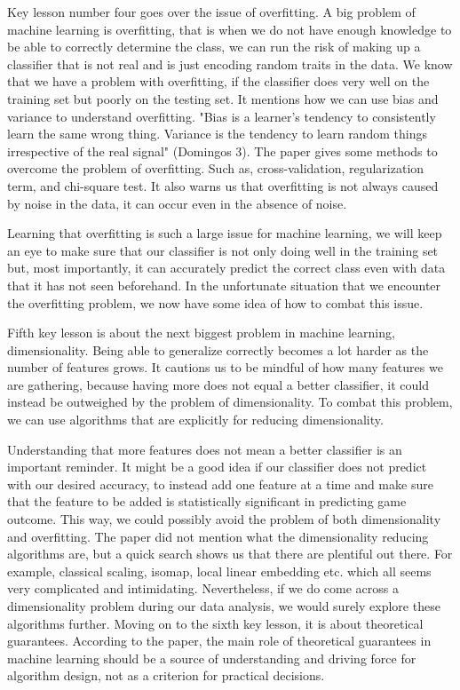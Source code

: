 \documentclass[a4paper,12pt]{report}
\begin{document}
Key lesson number four goes over the issue of overfitting. A big problem of machine learning is overfitting, that is when we do not have enough knowledge to be able to correctly determine the class, we can run the risk of making up a classifier that is not real and is just encoding random traits in the data. We know that we have a problem with overfitting, if the classifier does very well on the training set but poorly on the testing set. It mentions how we can use bias and variance to understand overfitting. "Bias is a learner’s tendency to consistently learn the same wrong thing. Variance is the tendency to learn random things irrespective of the real signal" (Domingos 3). The paper gives some methods to overcome the problem of overfitting. Such as, cross-validation, regularization term, and chi-square test. It also warns us that overfitting is not always caused by noise in the data, it can occur even in the absence of noise.

Learning that overfitting is such a large issue for machine learning, we will keep an eye to make sure that our classifier is not only doing well in the training set but, most importantly, it can accurately predict the correct class even with data that it has not seen beforehand. In the unfortunate situation that we encounter the overfitting problem, we now have some idea of how to combat this issue.

Fifth key lesson is about the next biggest problem in machine learning, dimensionality. Being able to generalize correctly becomes a lot harder as the number of features grows. It cautions us to be mindful of how many features we are gathering, because having more does not equal a better classifier, it could instead be outweighed by the problem of dimensionality. To combat this problem, we can use algorithms that are explicitly for reducing dimensionality.

Understanding that more features does not mean a better classifier is an important reminder. It might be a good idea if our classifier does not predict with our desired accuracy, to instead add one feature at a time and make sure that the feature to be added is statistically significant in predicting game outcome. This way, we could possibly avoid the problem of both dimensionality and overfitting. The paper did not mention what the dimensionality reducing algorithms are, but a quick search shows us that there are plentiful out there. For example, classical scaling, isomap, local linear embedding etc. which all seems very complicated and intimidating. Nevertheless, if we do come across a dimensionality problem during our data analysis, we would surely explore these algorithms further.
Moving on to the sixth key lesson, it is about theoretical guarantees. According to the paper, the main role of theoretical guarantees in machine learning should be a source of understanding and driving force for algorithm design, not as a criterion for practical decisions.
\end{document}
